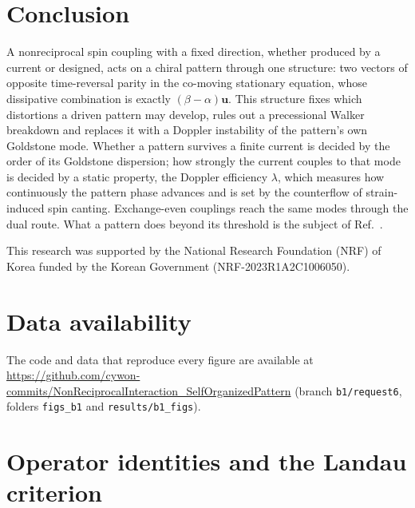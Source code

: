 \documentclass[prb,reprint,amsmath,amssymb,superscriptaddress,floatfix]{revtex4-2}
\newcommand{\vu}{\mathbf u}
\begin{document}
\section{Conclusion}
\label{sec:conclusion}

A nonreciprocal spin coupling with a fixed direction, whether produced by a current or designed, acts on a chiral pattern through one structure: two vectors of opposite time-reversal parity in the co-moving stationary equation, whose dissipative combination is exactly $(\beta-\alpha)\vu$. This structure fixes which distortions a driven pattern may develop, rules out a precessional Walker breakdown and replaces it with a Doppler instability of the pattern's own Goldstone mode. Whether a pattern survives a finite current is decided by the order of its Goldstone dispersion; how strongly the current couples to that mode is decided by a static property, the Doppler efficiency $\lambda$, which measures how continuously the pattern phase advances and is set by the counterflow of strain-induced spin canting. Exchange-even couplings reach the same modes through the dual route. What a pattern does beyond its threshold is the subject of Ref.~\cite{B2}.

\begin{acknowledgments}
This research was supported by the National Research Foundation (NRF) of Korea funded by the Korean Government (NRF-2023R1A2C1006050).
\end{acknowledgments}

\section*{Data availability}
The code and data that reproduce every figure are available at \url{https://github.com/cywon-commits/NonReciprocalInteraction_SelfOrganizedPattern} (branch \texttt{b1/request6}, folders \texttt{figs\_b1} and \texttt{results/b1\_figs}).

\appendix

\section{Operator identities and the Landau criterion}
\label{app:identities}
\end{document}
